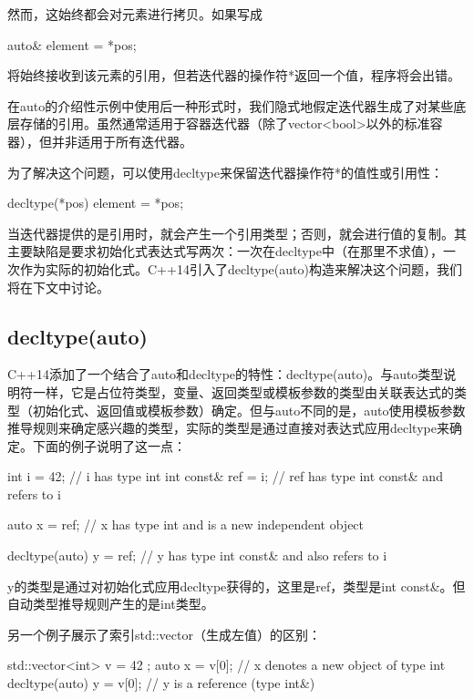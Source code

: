 然而，这始终都会对元素进行拷贝。如果写成

\begin{cpp}
auto& element = *pos;
\end{cpp}

将始终接收到该元素的引用，但若迭代器的操作符*返回一个值，程序将会出错。

\begin{notice}
在auto的介绍性示例中使用后一种形式时，我们隐式地假定迭代器生成了对某些底层存储的引用。虽然通常适用于容器迭代器（除了vector<bool>以外的标准容器），但并非适用于所有迭代器。
\end{notice}

为了解决这个问题，可以使用decltype来保留迭代器操作符*的值性或引用性：

\begin{cpp}
decltype(*pos) element = *pos;
\end{cpp}

当迭代器提供的是引用时，就会产生一个引用类型；否则，就会进行值的复制。其主要缺陷是要求初始化式表达式写两次：一次在decltype中（在那里不求值），一次作为实际的初始化式。C++14引入了decltype(auto)构造来解决这个问题，我们将在下文中讨论。

\subsection{decltype(auto)}

C++14添加了一个结合了auto和decltype的特性：decltype(auto)。与auto类型说明符一样，它是占位符类型，变量、返回类型或模板参数的类型由关联表达式的类型（初始化式、返回值或模板参数）确定。但与auto不同的是，auto使用模板参数推导规则来确定感兴趣的类型，实际的类型是通过直接对表达式应用decltype来确定。下面的例子说明了这一点：

\begin{cpp}
int i = 42; // i has type int
int const& ref = i; // ref has type int const& and refers to i

auto x = ref; // x has type int and is a new independent object

decltype(auto) y = ref; // y has type int const& and also refers to i
\end{cpp}

y的类型是通过对初始化式应用decltype获得的，这里是ref，类型是int const\&。但自动类型推导规则产生的是int类型。

另一个例子展示了索引std::vector（生成左值）的区别：

\begin{cpp}
std::vector<int> v = { 42 };
auto x = v[0]; // x denotes a new object of type int
decltype(auto) y = v[0]; // y is a reference (type int&)
\end{cpp}


